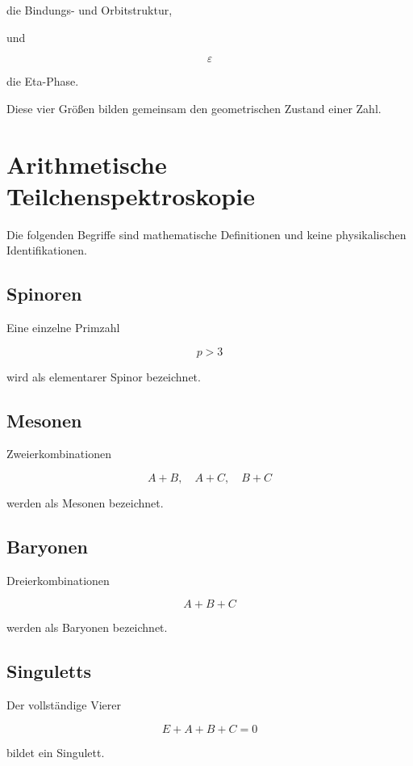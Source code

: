 \documentclass[11pt,a4paper]{article}
\theoremstyle{definition}
\theoremstyle{remark}
\begin{document}
	die Bindungs- und Orbitstruktur,
	
	und
	
	\[
	\varepsilon
	\]
	
	die Eta-Phase.
	
	Diese vier Größen bilden gemeinsam
	den geometrischen Zustand einer Zahl.
	
	
	\section{Arithmetische Teilchenspektroskopie}
	
	Die folgenden Begriffe sind mathematische Definitionen
	und keine physikalischen Identifikationen.
	
	\subsection{Spinoren}
	
	Eine einzelne Primzahl
	
	\[
	p>3
	\]
	
	wird als elementarer Spinor bezeichnet.
	
	\subsection{Mesonen}
	
	Zweierkombinationen
	
	\[
	A+B,
	\quad
	A+C,
	\quad
	B+C
	\]
	
	werden als Mesonen bezeichnet.
	
	\subsection{Baryonen}
	
	Dreierkombinationen
	
	\[
	A+B+C
	\]
	
	werden als Baryonen bezeichnet.
	
	\subsection{Singuletts}
	
	Der vollständige Vierer
	
	\[
	E+A+B+C=0
	\]
	
	bildet ein Singulett.
	
	
\end{document}
